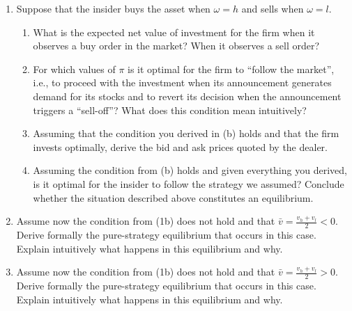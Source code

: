 	\begin{enumerate}
		\item 
		Suppose that the insider buys the asset when $\omega=h$ and sells when $\omega=l$. 
		\begin{enumerate}
			\item 
			What is the expected net value of investment for the firm when it observes a buy order in the market? When it observes a sell order? 
			
			\item 
			For which values of $\pi$ is it optimal for the firm to ``follow the market'', i.e., to proceed with the investment when its announcement generates demand for its stocks and to revert its decision when the announcement triggers a ``sell-off''? What does this condition mean intuitively?
			
			\item 
			Assuming that the condition you derived in (b) holds and that the firm invests optimally, derive the bid and ask prices quoted by the dealer.
			
			\item 
			Assuming the condition from (b) holds and given everything you derived, is it optimal for the insider to follow the strategy we assumed? Conclude whether the situation described above constitutes an equilibrium.
		\end{enumerate}
		
		\item 
		Assume now the condition from (1b) does not hold and that $\bar{v} = \frac{v_h+v_l}{2} < 0$. Derive formally the pure-strategy equilibrium that occurs in this case. Explain intuitively what happens in this equilibrium and why.
		
		\item 
		Assume now the condition from (1b) does not hold and that $\bar{v} = \frac{v_h+v_l}{2} > 0$. Derive formally the pure-strategy equilibrium that occurs in this case. Explain intuitively what happens in this equilibrium and why.
	\end{enumerate}


